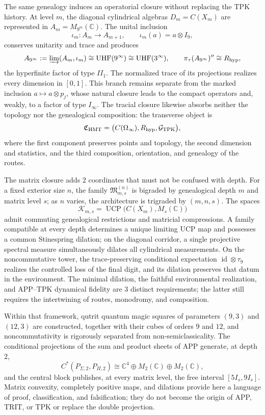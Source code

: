 The same genealogy induces an operatorial closure without replacing the TPK
history. At level \(m\), the diagonal cylindrical algebras
\(D_m=C(X_m)\) are represented in \(A_m=M_{9^m}(\mathbb C)\). The unital
inclusion
\[
 \iota_m:A_m\longrightarrow A_{m+1},
 \qquad \iota_m(a)=a\otimes I_9,
\]
conserves unitarity and trace and produces
\[
 A_{9^\infty}:=\varinjlim(A_m,\iota_m)
 \cong\mathrm{UHF}(9^\infty)
 \cong\mathrm{UHF}(3^\infty),
 \qquad
 \pi_\tau(A_{9^\infty})''\cong R_{\rm hyp},
\]
the hyperfinite factor of type \(II_1\). The normalized trace of its projections realizes every dimension in \([0,1]\). This branch remains separate from the marked inclusion \(a\mapsto a\otimes p_j\), whose natural closure leads to the compact operators and, weakly, to a factor of type \(I_\infty\). The tracial closure likewise absorbs neither the topology nor the genealogical composition: the transverse object is
\[
 \mathfrak C_{\rm HMT}
 =\bigl(C(\Omega_\infty),R_{\rm hyp},\mathcal G_{\rm TPK}\bigr),
\]
where the first component preserves points and topology, the second dimension
and statistics, and the third composition, orientation, and genealogy of the
routes.

The matrix closure adds \(2\) coordinates that must not be confused with
depth. For a fixed exterior size \(n\), the family
\(\mathfrak M_{m,s}^{(n)}\) is bigraded by genealogical depth \(m\)
and matrix level \(s\); as \(n\) varies, the architecture is trigraded by
\((m,n,s)\). The spaces
\[
 \mathcal K_{m,s}
 =\operatorname{UCP}\!\bigl(C(X_m),M_s(\mathbb C)\bigr)
\]
admit commuting genealogical restrictions and matricial compressions.
A family compatible at every depth determines a unique
limiting UCP map and possesses a common Stinespring dilation; on the
diagonal corridor, a single projective spectral measure simultaneously dilates
all cylindrical measurements. On the noncommutative tower, the trace-preserving
conditional expectation
\(\operatorname{id}\otimes\tau_9\) realizes the controlled loss of the final
digit, and its dilation preserves that datum in the environment. The minimal dilation,
the faithful environmental realization, and APP--TPK dynamical fidelity are \(3\)
distinct requirements; the latter still requires the intertwining of routes,
monodromy, and composition.

Within that framework, qutrit quantum magic squares of parameters
\((9,3)\) and \((12,3)\) are constructed, together with their cubes of orders \(9\) and \(12\), and
noncommutativity is rigorously separated from non-semiclassicality. The conditional projections
of the sum and product sheets of APP generate, at depth \(2\),
\[
 C^*(P_{\Sigma,2},P_{\Pi,2})
 \cong\mathbb C^4\oplus M_2(\mathbb C)\oplus M_2(\mathbb C),
\]
and the central block publishes, at every matrix level, the free interval
\([5I_s,9I_s]\). Matrix convexity, completely positive maps,
and dilations provide here a language of proof, classification, and falsification;
they do not become the origin of APP, TRIT, or TPK or replace
the double projection.

